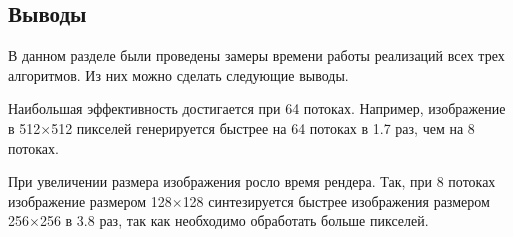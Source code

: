 
\subsection*{Выводы}
В данном разделе были проведены замеры времени работы реализаций всех трех алгоритмов. Из них можно сделать следующие выводы.

Наибольшая эффективность достигается при 64 потоках. Например, изображение в 512$\times$512 пикселей генерируется быстрее на 64 потоках в 1.7 раз, чем на 8 потоках.

При увеличении размера изображения росло время рендера. Так, при 8 потоках изображение размером 128$\times$128 синтезируется быстрее изображения размером 256$\times$256 в 3.8 раз, так как необходимо обработать больше пикселей. 


\newpage

